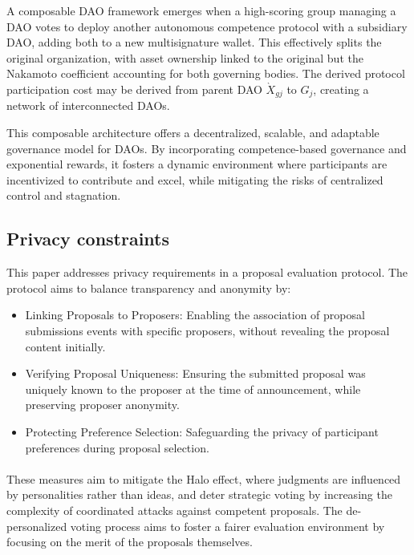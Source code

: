 \documentclass{article}
\begin{document}
\begin{CJK}{UTF8}{gbsn}
\begin{multicols}{2}
        

        A composable DAO framework emerges when a high-scoring group managing a DAO votes to deploy another autonomous competence protocol with a subsidiary DAO, adding both to a new multisignature wallet. This effectively splits the original organization, with asset ownership linked to the original but the Nakamoto coefficient accounting for both governing bodies. The derived protocol participation cost may be derived from parent DAO  $ \grave{X}_{gj}$ to $G_j$, creating a network of interconnected DAOs.

        This composable architecture offers a decentralized, scalable, and adaptable governance model for DAOs. By incorporating competence-based governance and exponential rewards, it fosters a dynamic environment where participants are incentivized to contribute and excel, while mitigating the risks of centralized control and stagnation.


        \subsection{Privacy constraints}

        This paper addresses privacy requirements in a proposal evaluation protocol. The protocol aims to balance transparency and anonymity by:
        \begin{itemize}
            \item Linking Proposals to Proposers: Enabling the association of proposal submissions events with specific proposers, without revealing the proposal content initially.
            \item Verifying Proposal Uniqueness: Ensuring the submitted proposal was uniquely known to the proposer at the time of announcement, while preserving proposer anonymity.
            \item Protecting Preference Selection: Safeguarding the privacy of participant preferences during proposal selection.

        \end{itemize}
        \paragraph{}

        These measures aim to mitigate the Halo effect, where judgments are influenced by personalities rather than ideas, and deter strategic voting by increasing the complexity of coordinated attacks against competent proposals. The de-personalized voting process aims to foster a fairer evaluation environment by focusing on the merit of the proposals themselves.


\end{multicols}
\end{CJK}
\end{document}
